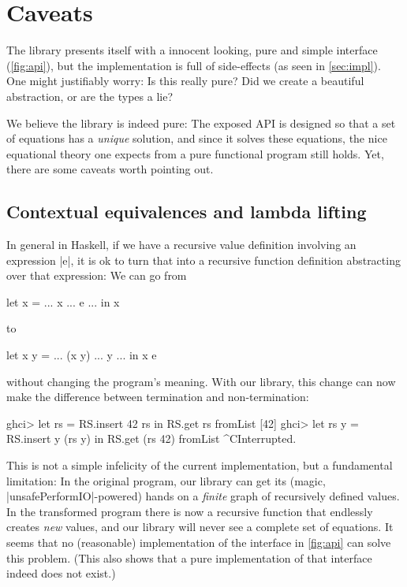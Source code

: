 \documentclass[manuscript,review,screen,acmsmall]{acmart}
\begin{document}
\section{Caveats}\label{sec:limitations}

The library presents itself with a innocent looking, pure and simple interface (\cref{fig:api}), but the implementation is full of side-effects (as seen in \cref{sec:impl}). One might justifiably worry: Is this really pure? Did we create a beautiful abstraction, or are the types a lie?

We believe the library is indeed pure: The exposed API is designed so that a set of equations has a \emph{unique} solution, and since it solves these equations, the nice equational theory one expects from a pure functional program still holds. Yet, there are some caveats worth pointing out.

\subsection{Contextual equivalences and lambda lifting}\label{sec:lim-lambda-lift}

In general in Haskell, if we have a recursive value definition involving an expression |e|, it is ok to turn that into a recursive function definition abstracting over that expression: We can go from
\begin{code}
let x = ... x ... e ... in x
\end{code}
to
\begin{code}
let x y = ... (x y) ... y ... in x e
\end{code}
without changing the program's meaning. With our library, this change can now make the difference between termination and non-termination:
\begin{code}
ghci> let rs = RS.insert 42 rs in RS.get rs
fromList [42]
ghci> let rs y = RS.insert y (rs y) in RS.get (rs 42)
fromList ^CInterrupted.
\end{code}

This is not a simple infelicity of the current implementation, but a fundamental limitation: In the original program, our library can get its (magic, |unsafePerformIO|-powered) hands on a \emph{finite} graph of recursively defined values. In the transformed program there is now a recursive function that endlessly creates \emph{new} values, and our library will never see a complete set of equations. It seems that no (reasonable) implementation of the interface in \cref{fig:api} can solve this problem. (This also shows that a pure implementation of that interface indeed does not exist.)
\end{document}
